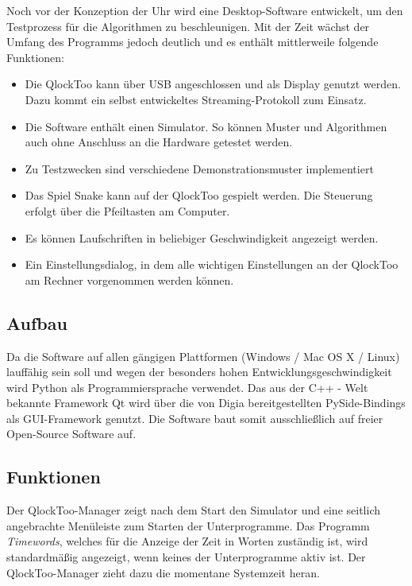 \begin{multicols}{2}
Noch vor der Konzeption der Uhr wird eine Desktop-Software entwickelt, um den Testprozess für die Algorithmen zu beschleunigen. Mit der Zeit wächst der Umfang des Programms jedoch deutlich und es enthält mittlerweile folgende Funktionen:

\begin{itemize}
\item Die QlockToo kann über USB angeschlossen und als Display genutzt werden. Dazu kommt ein selbst entwickeltes Streaming-Protokoll zum Einsatz.
\item Die Software enthält einen Simulator. So können Muster und Algorithmen auch ohne Anschluss an die Hardware getestet werden.
\item Zu Testzwecken sind verschiedene Demonstrationsmuster implementiert
\item Das Spiel Snake kann auf der QlockToo gespielt werden. Die Steuerung erfolgt über die Pfeiltasten am Computer.
\item Es können Laufschriften in beliebiger Geschwindigkeit angezeigt werden.
\item Ein Einstellungsdialog, in dem alle wichtigen Einstellungen an der QlockToo am Rechner vorgenommen werden können.
\end{itemize}

\subsection{Aufbau}
Da die Software auf allen gängigen Plattformen (Windows / Mac OS X / Linux) lauffähig sein soll und wegen der besonders hohen Entwicklungsgeschwindigkeit wird Python als Programmiersprache verwendet.
Das aus der C++ - Welt bekannte Framework Qt wird über die von Digia bereitgestellten PySide-Bindings als GUI-Framework genutzt. Die Software baut somit ausschließlich auf freier Open-Source Software auf.

\subsection{Funktionen}
Der QlockToo-Manager zeigt nach dem Start den Simulator und eine seitlich angebrachte Menüleiste zum Starten der Unterprogramme.
Das Programm \emph{Timewords}, welches für die Anzeige der Zeit in Worten zuständig ist, wird standardmäßig angezeigt, wenn keines der Unterprogramme aktiv ist. Der QlockToo-Manager zieht dazu die momentane Systemzeit heran.


\end{multicols}
